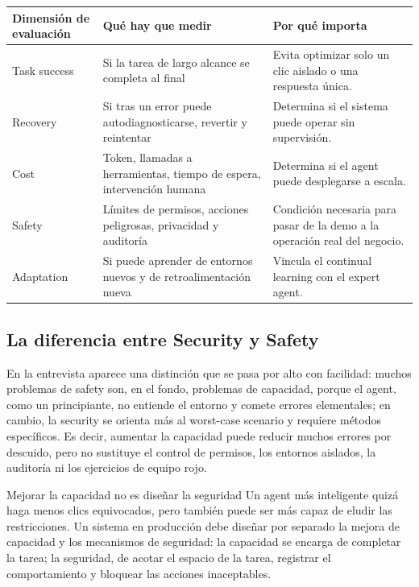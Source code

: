 \noindent\begin{tabularx}{\textwidth}{p{}p{}X}
\toprule
Dimensión de evaluación & Qué hay que medir & Por qué importa \\
\midrule
Task success & Si la tarea de largo alcance se completa al final & Evita optimizar solo un clic aislado o una respuesta única. \\
Recovery & Si tras un error puede autodiagnosticarse, revertir y reintentar & Determina si el sistema puede operar sin supervisión. \\
Cost & Token, llamadas a herramientas, tiempo de espera, intervención humana & Determina si el agent puede desplegarse a escala. \\
Safety & Límites de permisos, acciones peligrosas, privacidad y auditoría & Condición necesaria para pasar de la demo a la operación real del negocio. \\
Adaptation & Si puede aprender de entornos nuevos y de retroalimentación nueva & Vincula el continual learning con el expert agent. \\
\bottomrule
\end{tabularx}

\subsection{La diferencia entre Security y Safety}

En la entrevista aparece una distinción que se pasa por alto con facilidad: muchos problemas de safety son, en el fondo, problemas de capacidad, porque el agent, como un principiante, no entiende el entorno y comete errores elementales; en cambio, la security se orienta más al worst-case scenario y requiere métodos específicos. Es decir, aumentar la capacidad puede reducir muchos errores por descuido, pero no sustituye el control de permisos, los entornos aislados, la auditoría ni los ejercicios de equipo rojo.

\begin{warningbox}{Mejorar la capacidad no es diseñar la seguridad}
Un agent más inteligente quizá haga menos clics equivocados, pero también puede ser más capaz de eludir las restricciones. Un sistema en producción debe diseñar por separado la mejora de capacidad y los mecanismos de seguridad: la capacidad se encarga de completar la tarea; la seguridad, de acotar el espacio de la tarea, registrar el comportamiento y bloquear las acciones inaceptables.
\end{warningbox}


